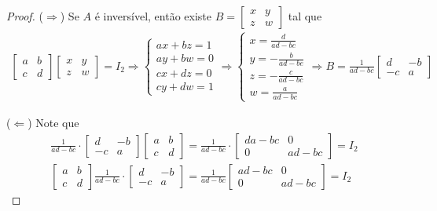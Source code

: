 \documentclass{article}
\begin{document}
\begin{proof}
	($\Rightarrow$) Se $A$ é inversível, então existe $\displaystyle{B = \begin{bmatrix}
		x & y \\
		z & w
		\end{bmatrix}}$ tal que
	\begin{align*}
	\begin{bmatrix}
	a & b \\
	c & d
	\end{bmatrix}\begin{bmatrix}
	x & y \\
	z & w
	\end{bmatrix} = I_2 \Rightarrow \begin{cases}
	ax + bz = 1 \\
	ay + bw = 0 \\
	cx + dz = 0 \\
	cy + dw = 1
	\end{cases} \Rightarrow \begin{cases}
	x = \displaystyle{\frac{d}{ad - bc}} \\
	y = \displaystyle{-\frac{b}{ad-be}} \\
	z = \displaystyle{-\frac{c}{ad - bc}} \\
	w = \displaystyle{\frac{a}{ad - bc}}
	\end{cases} \Rightarrow B = \frac{1}{ad - bc}\begin{bmatrix}
	d & - b \\
	-c & a
	\end{bmatrix}
	\end{align*}
	\par\vspace{0.3cm}\hspace{17pt}($\Leftarrow$) Note que
	\begin{align*}
	\frac{1}{ad - bc}\cdot\begin{bmatrix}
	d & -b \\
	-c & a
	\end{bmatrix}\begin{bmatrix}
	a & b \\
	c & d
	\end{bmatrix} = \frac{1}{ad - bc}\cdot\begin{bmatrix}
	da - bc & 0 \\
	0 & ad - bc
	\end{bmatrix} = I_2 \\
	\begin{bmatrix}
	a & b \\
	c & d
	\end{bmatrix}\frac{1}{ad - bc}\cdot\begin{bmatrix}
	d & -b \\
	-c & a
	\end{bmatrix} = \frac{1}{ad - bc}\begin{bmatrix}
	ad - bc & 0 \\
	0 & ad - bc
	\end{bmatrix} = I_2
	\end{align*}
\end{proof}
\end{document}

